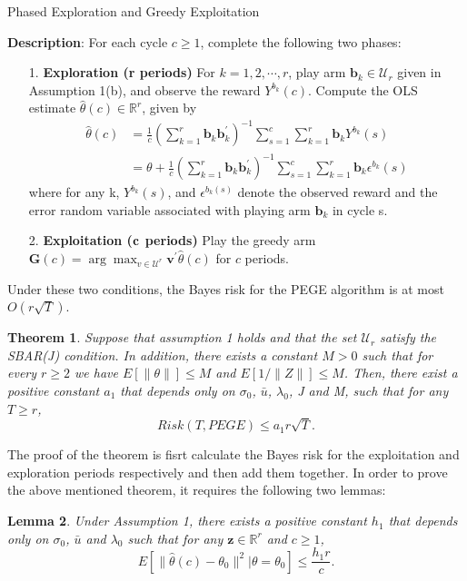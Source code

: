 \documentclass{article}
\newtheorem{theorem}{Theorem}
\newtheorem{lemma}[theorem]{Lemma}
\theoremstyle{plain}
\theoremstyle{definition}
\begin{document}
\begin{algorithm}\label{alg:PEGE}
\caption{Phased Exploration and Greedy Exploitation}
\textbf{Description}: For each cycle $c\geq 1$, complete the following two phases:
\begin{itemize}
\item [1. ] \textbf{Exploration (r periods)} For $k=1,2,\cdots,r$, play arm $\textbf{b}_{k}\in \mathcal{U}_{r}$ given in Assumption 1(b), and observe the reward $Y^{b_{k}}(c)$. Compute the OLS estimate $\hat{\theta}(c)\in \mathbb{R}^{r}$, given by
\begin{align}
\hat{\theta}(c)&=\frac{1}{c}(\sum_{k=1}^{r}\textbf{b}_{k}\textbf{b}_{k}^{'})^{-1}\sum_{s=1}^{c}\sum_{k=1}^{r}\textbf{b}_{k}Y^{b_{k}}(s) \nonumber \\
&=\theta+\frac{1}{c}(\sum_{k=1}^{r}\textbf{b}_{k}\textbf{b}_{k}^{'})^{-1}\sum_{s=1}^{c}\sum_{k=1}^{r}\textbf{b}_{k}\epsilon^{b_{k}}(s) \nonumber 
\end{align}
where for any k, $Y^{b_{k}}(s)$, and $\epsilon^{b_{k}(s)}$ denote the observed reward and the error random variable associated with playing arm $\textbf{b}_{k}$ in cycle s.
\item [2. ] \textbf{Exploitation ($\bold{c}$ periods)} Play the greedy arm $\textbf{G}(c)=\arg \max_{v\in \mathcal{U}^{r}}\textbf{v}^{'}\hat{\theta}(c)$ for $c$ periods.
\end{itemize}
\end{algorithm}


Under these two conditions, the Bayes risk for the PEGE algorithm is at most $O(r\sqrt{T})$.

\begin{theorem}
Suppose that assumption 1 holds and that the set $\mathcal{U}_{r}$ satisfy the SBAR(J) condition. In addition, there exists a constant $M>0$ such that for every $r\geq 2$ we have $E[\|\theta\|]\leq M$ and $E[1/\|Z\|]\leq M$. Then, there exist a positive constant $a_{1}$ that depends only on $\sigma_{0}$, $\bar{u}$, $\lambda_{0}$, J and M, such that for any $T\geq r$,
\begin{equation}
Risk(T,PEGE)\leq a_{1}r\sqrt{T}. \nonumber 
\end{equation}

\end{theorem}

The proof of the theorem is fisrt calculate the Bayes risk for the exploitation and exploration periods respectively and then add them together. In order to prove the above mentioned theorem, it requires the following two lemmas:
\begin{lemma}
Under Assumption 1, there exists a positive constant $h_{1}$ that depends only on $\sigma_{0}$, $\bar{u}$ and $\lambda_{0}$ such that for any $\textbf{z}\in \mathbb{R}^{r}$ and $c\geq 1$,
\begin{equation}\label{eq:Esquare}
E\left[\|\hat{\theta}(c)-\theta_{0}\|^{2}|\theta=\theta_{0}\right]\leq \frac{h_{1}r}{c}. 
\end{equation} 
\end{lemma}
\end{document}
